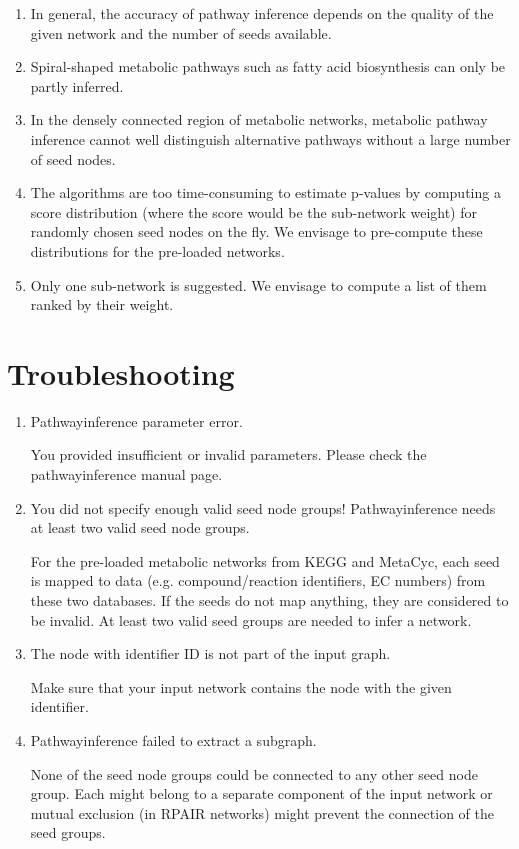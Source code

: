 \begin{enumerate}

\item In general, the accuracy of pathway inference depends on the quality of the given network and the number of seeds available.

\item Spiral-shaped metabolic pathways such as fatty acid biosynthesis can only be partly inferred.

\item In the densely connected region of metabolic networks, metabolic pathway inference cannot well distinguish alternative pathways
without a large number of seed nodes.

\item The algorithms are too time-consuming to estimate p-values by computing a score distribution (where the score would be the sub-network weight)
for randomly chosen seed nodes on the fly. We envisage to pre-compute these distributions for the pre-loaded networks.

\item Only one sub-network is suggested. We envisage to compute a list of them ranked by their weight.

\end{enumerate}

\section{Troubleshooting}

\begin{enumerate}

\item Pathwayinference parameter error.

	You provided insufficient or invalid parameters. Please check the pathwayinference manual page.

\item You did not specify enough valid seed node groups! Pathwayinference needs at least two valid seed node groups.

	For the pre-loaded metabolic networks from KEGG and MetaCyc, each seed
	is mapped to data (e.g. compound/reaction identifiers, EC numbers) from these two databases.
	If the seeds do not map anything, they are considered to be invalid.
	At least two valid seed groups are needed to infer a network.

\item The node with identifier ID is not part of the input graph.

	Make sure that your input network contains the node with the given identifier.

\item Pathwayinference failed to extract a subgraph.

    None of the seed node groups could be connected to any other seed node group. Each might belong to a
    separate component of the input network or mutual exclusion (in RPAIR networks) might prevent the connection of
    the seed groups.

\end{enumerate}